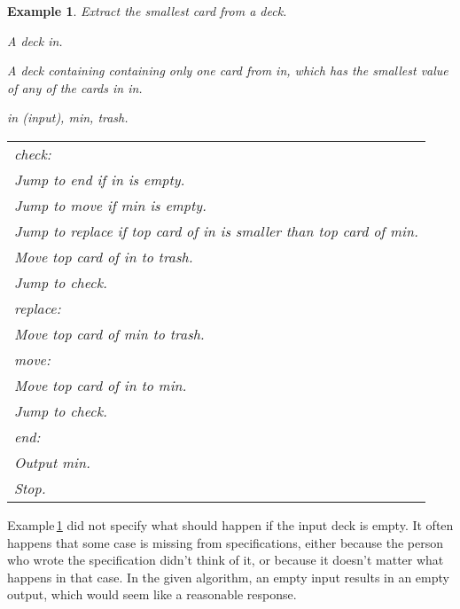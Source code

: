 \documentclass[a4paper,twoside]{tufte-handout}
\newtheorem{example}{Example}
\newcommand\lbl[1]{\hspace{-1em}\emph{#1:}}
\begin{document}
\begin{example}\label{extractsmallest}
  Extract the smallest card from a deck.
  \begin{description}
  \item[Input:] A deck \emph{in}.
  \item[Output:] A deck containing containing only one
    card from \emph{in}, which has the smallest value of any of the
    cards in \emph{in}.
  \item[Decks:] \emph{in} (input), \emph{min}, \emph{trash}.
  \item[Algorithm:]
  \item\normalfont
    \begin{tabular}{l}
      \lbl{check}\\
      Jump to \emph{end} if \emph{in} is empty.\\
      Jump to \emph{move} if \emph{min} is empty.\\
      Jump to \emph{replace} if top card of \emph{in} is smaller than
      top card of \emph{min}.\\
      Move top card of \emph{in} to \emph{trash}.\\
      Jump to \emph{check}.\\
      \lbl{replace}\\
      Move top card of \emph{min} to \emph{trash}.\\
      \lbl{move}\\
      Move top card of \emph{in} to \emph{min}.\\
      Jump to \emph{check}.\\
      \lbl{end}\\
      Output \emph{min}.\\
      Stop.
    \end{tabular}
  \end{description}
\end{example}

Example\,\ref{extractsmallest} did not specify what should happen if
the input deck is empty. It often happens that some case is missing
from specifications, either because the person who wrote the
specification didn't think of it, or because it doesn't matter what
happens in that case. In the given algorithm, an empty input results
in an empty output, which would seem like a reasonable response.

\end{document}
